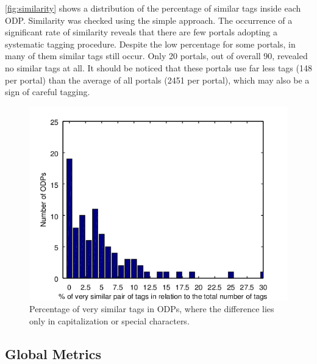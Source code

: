 \autoref{fig:similarity} shows a distribution of the percentage of similar tags inside each ODP.
Similarity was checked using the simple approach.
The occurrence of a significant rate of similarity reveals that there are few portals adopting a systematic tagging procedure.
Despite the low percentage for some portals, in many of them similar tags still occur.
Only 20 portals, out of overall 90, revealed no similar tags at all. 
It should be noticed that these portals use far less tags (148 per portal) than the average of all portals (2451 per portal), which may also be a sign of careful tagging.

\begin{figure}[tb]
\begin{center}
\includegraphics[scale=1.2]{images/similarity.png}
\caption[Percentage of very similar tags in ODPs.]{Percentage of very similar tags in ODPs, where the difference lies only in capitalization or special characters.}
\label{fig:similarity}
\end{center}
\end{figure}



\subsection{Global Metrics}
\label{sec:global_metrics}

